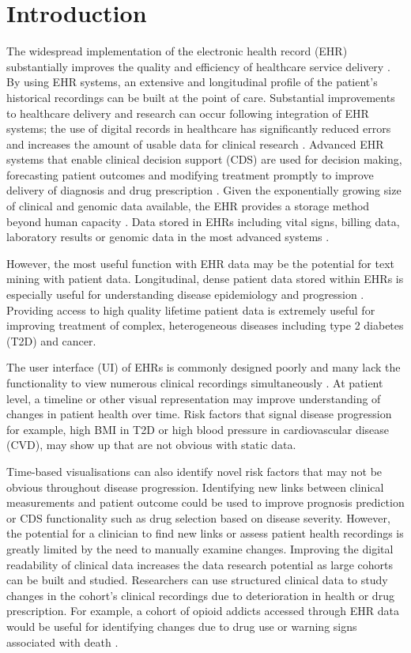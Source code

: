 \documentclass{bioinfo}
\begin{document}
\section{Introduction}
The widespread implementation of the electronic health record (EHR) substantially improves the quality and efficiency of healthcare service delivery \cite{Evans2016}. By using EHR systems, an extensive and longitudinal profile of the patient's historical recordings can be built at the point of care. Substantial improvements to healthcare delivery and research can occur following integration of EHR systems; the use of digital records in healthcare has significantly reduced errors and increases the amount of usable data for clinical research \citep{Williams2019}. 
Advanced EHR systems that enable clinical decision support (CDS) are used for decision making, forecasting patient outcomes and modifying treatment promptly to improve delivery of diagnosis and drug prescription \citep{CDS2}.
Given the exponentially growing size of clinical and genomic data available, the EHR provides a storage method beyond human capacity \cite{Williams2019}. Data stored in EHRs including vital signs, billing data, laboratory results or genomic data in the most advanced systems \citep{Denny2012}.      

However, the most useful function with EHR data may be the potential for text mining with patient data. Longitudinal, dense patient data stored within EHRs is especially useful for understanding disease epidemiology and progression \citep{Casey2016}. Providing access to high quality lifetime patient data is extremely useful for improving treatment of complex, heterogeneous diseases \citep{Faria-Campos2015} including type 2 diabetes (T2D) and cancer. 


The user interface (UI) of EHRs is commonly designed poorly and many lack the functionality to view numerous clinical recordings simultaneously \cite{Menachemi2011}. At patient level, a timeline or other visual representation may improve understanding of changes in patient health over time. Risk factors that signal disease progression for example, high BMI in T2D or high blood pressure in cardiovascular disease (CVD), may show up that are not obvious with static data.

Time-based visualisations can also identify novel risk factors that may not be obvious throughout disease progression. Identifying new links between clinical measurements and patient outcome could be used to improve prognosis prediction or CDS functionality such as drug selection based on disease severity. However, the potential for a clinician to find new links or assess patient health recordings is greatly limited by the need to manually examine changes. Improving the digital readability of clinical data increases the data research potential as large cohorts can be built and studied. Researchers can use structured clinical data to study changes in the cohort's clinical recordings due to deterioration in health or drug prescription. For example, a cohort of opioid addicts accessed through EHR data would be useful for identifying changes due to drug use or warning signs associated with death \citep{Casey2016}. 
\end{document}

